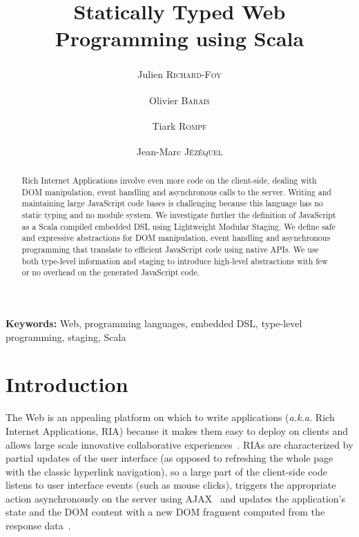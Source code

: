 \documentclass[american,english,runningheads]{llncs}
\newcommand{\etal}{\emph{et al.~}}
\newcommand{\aka}{\emph{a.k.a.}}
\newcommand{\noun}[1]{\textsc{#1}}
\begin{document}
\setcounter{lstlisting}{0}
\renewcommand{\thelstlisting}{\arabic{lstlisting}}

\title{Statically Typed Web Programming using Scala}

\author{Julien \noun{Richard-Foy}\textsuperscript{\textasteriskcentered}\textsuperscript{\textdaggerdbl} \and Olivier
\noun{Barais}\textsuperscript{\textasteriskcentered} \and Tiark \noun{Rompf}\textsuperscript{\textdagger} \and
Jean-Marc \noun{Jézéquel}\textsuperscript{\textasteriskcentered}}

\authorrunning{Julien \noun{Richard-Foy} \etal{}}

\maketitle


\begin{abstract}
Rich Internet Applications involve even more code on the client-side, dealing with DOM manipulation, event handling
and asynchronous calls to the server. Writing and maintaining large JavaScript code bases is challenging because this
language has no static typing and no module system. We investigate further the definition of JavaScript as a Scala
compiled embedded DSL using Lightweight Modular Staging. We define safe and expressive abstractions for DOM
manipulation, event handling and asynchronous programming that translate to efficient JavaScript code using native
APIs. We use both type-level information and staging to introduce high-level abstractions with few or no overhead on
the generated JavaScript code.
\end{abstract}

{\bf Keywords:} Web, programming languages, embedded DSL, type-level programming, staging, Scala

\section{Introduction}

The Web is an appealing platform on which to write applications (\aka{} Rich Internet Applications, RIA) because it
makes them easy to deploy on clients and allows large scale innovative collaborative
experiences~\cite{Farrell07_RIA,Mikkonen08_SpaghettiJs}. RIAs are characterized by partial updates of the user
interface (as opposed to refreshing the whole page with the classic hyperlink navigation), so a large part of the
client-side code listens to user interface events (such as mouse clicks), triggers the appropriate action
asynchronously on the server using AJAX~\cite{Garrett05_Ajax} and updates the application’s state and the DOM content
with a new DOM fragment computed from the response data~\cite{Farrell07_RIA,Busch09_StateOfArtRIA}.
\end{document}
